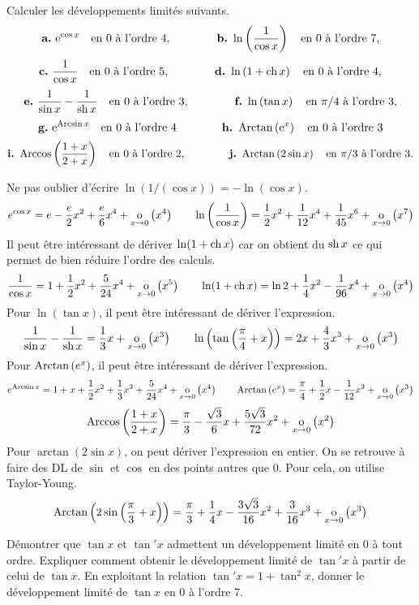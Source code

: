 \documentclass{magnolia}
\begin{document}
Calculer les développements limités suivants.
\[\textbf{a.}\ {\rm e}^{\cos x} \quad \text{en 0 à l'ordre 4}, \qquad\qquad
\textbf{b.}\ \ln\left(\frac{1}{\cos x}\right) \quad \text{en 0 à l'ordre 7},\]
\[\textbf{c.}\ \frac{1}{\cos x} \quad \text{en 0 à l'ordre 5}, \qquad\qquad
\textbf{d.}\ \ln\left(1+\operatorname{ch} x\right) \quad \text{en 0 à l'ordre 4},\]
\[\textbf{e.}\ \frac{1}{\sin x}-\frac{1}{\operatorname{sh} x} \quad \text{en 0 à l'ordre 3},\qquad\qquad
\textbf{f.}\ \ln\left(\tan x\right) \quad \text{en $\pi/4$ à l'ordre 3},\]
\[\textbf{g.}\ {\rm e}^{\operatorname{Arcsin} x} \quad \text{en 0 à l'ordre 4}\qquad\qquad
\textbf{h.}\ \operatorname{Arctan}\left({\rm e}^x\right) \quad \text{en 0 à l'ordre 3}\]
\[\textbf{i.}\ \operatorname{Arccos}\left(\frac{1+x}{2+x}\right) \quad \text{en 0 à l'ordre 2},\qquad\qquad
\textbf{j.}\ \operatorname{Arctan}\left(2\sin x\right) \quad \text{en $\pi/3$ à l'ordre 3}.\]
\begin{sol}
Ne pas oublier d'écrire $\ln(1/(\cos x))=-\ln(\cos x)$.
\[e^{\cos x}=e-\frac{e}{2}x^2+\frac{e}{6}x^4+\underset{x \rightarrow 0}{\text{o}}\left(x^4\right) \qquad
  \ln\left(\frac{1}{\cos x}\right)=\frac{1}{2}x^2+\frac{1}{12}x^4+\frac{1}{45}x^6+
  \underset{x \rightarrow 0}{\text{o}}\left(x^7\right)\]
Il peut être intéressant de dériver $\ln(1+\operatorname{ch} x)$ car on obtient du $\operatorname{sh} x$
ce qui permet de bien réduire l'ordre des calculs.
\[\frac{1}{\cos x}=1+\frac{1}{2}x^2+\frac{5}{24}x^4+\underset{x \rightarrow 0}{\text{o}}\left(x^5\right) \qquad
  \ln(1+\operatorname{ch} x)=\ln 2+\frac{1}{4}x^2-\frac{1}{96}x^4+\underset{x \rightarrow 0}{\text{o}}\left(x^4\right)\]
Pour $\ln(\tan x)$, il peut être intéressant de dériver l'expression.
\[\frac{1}{\sin x}-\frac{1}{\operatorname{sh} x}=\frac{1}{3}x+\underset{x \rightarrow 0}{\text{o}}\left(x^3\right) \qquad
  \ln\left(\tan\left(\frac{\pi}{4}+x\right)\right)=2x+\frac{4}{3}x^3+\underset{x \rightarrow 0}{\text{o}}\left(x^3\right)\]
Pour $\operatorname{Arctan}\left(e^x\right)$, il peut être intéressant de dériver l'expression.
\[e^{\operatorname{Arcsin} x}=1+x+\frac{1}{2}x^2+\frac{1}{3}x^3+\frac{5}{24}x^4+
  \underset{x \rightarrow 0}{\text{o}}\left(x^4\right) \qquad
  \operatorname{Arctan}\left(e^x\right)=\frac{\pi}{4}+\frac{1}{2}x-\frac{1}{12}x^3+\underset{x \rightarrow 0}{\text{o}}\left(x^3\right)\]
\[\operatorname{Arccos}\left(\frac{1+x}{2+x}\right)=\frac{\pi}{3}-\frac{\sqrt{3}}{6}x+
  \frac{5\sqrt{3}}{72}x^2+\underset{x \rightarrow 0}{\text{o}}\left(x^2\right)\]
Pour $\arctan(2\sin x)$, on peut dériver l'expression en entier. On se
retrouve à faire des DL de $\sin$ et $\cos$ en des points autres que 0. Pour
cela, on utilise Taylor-Young.
\[\operatorname{Arctan}\left(2\sin\left(\frac{\pi}{3}+x\right)\right)=\frac{\pi}{3}+\frac{1}{4}x
  -\frac{3\sqrt{3}}{16}x^2+\frac{3}{16}x^3+\underset{x \rightarrow 0}{\text{o}}\left(x^3\right)\]
\end{sol}



\begin{questions}
\question Démontrer que $\tan x$ et $\tan' x$ admettent un développement
  limité en $0$ à tout ordre. Expliquer comment obtenir le développement
  limité de $\tan'x$ à partir de celui de $\tan x$.
\question En exploitant la relation $\tan'x=1+\tan^2 x$, donner le
  développement limité de $\tan x$ en 0 à l'ordre 7.
\end{questions}
\end{document}
